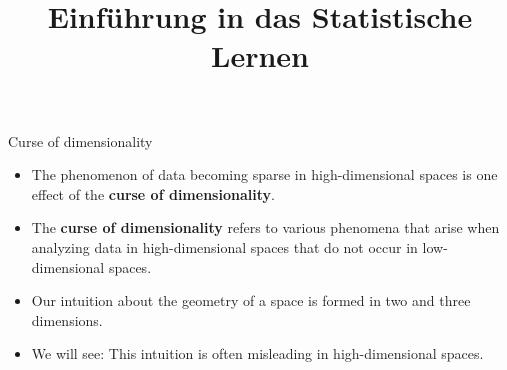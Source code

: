 



\newcommand{\titlefigure}{figure_man/hypercube.png}
\newcommand{\learninggoals}{
  \item Understand that our intuition about geometry fails in high-dimensional spaces
  \item Understand the effects of the curse of dimensionality
}

\title{Einführung in das Statistische Lernen}
\date{}






\begin{vbframe}{Curse of dimensionality}


\begin{itemize}
\item The phenomenon of data becoming sparse in high-dimensional spaces is one effect of the \textbf{curse of dimensionality}.
\item The \textbf{curse of dimensionality} refers to various phenomena that arise when analyzing data in high-dimensional spaces that do not occur in low-dimensional spaces.
\item Our intuition about the geometry of a space is formed in two and three dimensions.
\item We will see: This intuition is often misleading in high-dimensional spaces.
\end{itemize}

\end{vbframe}

